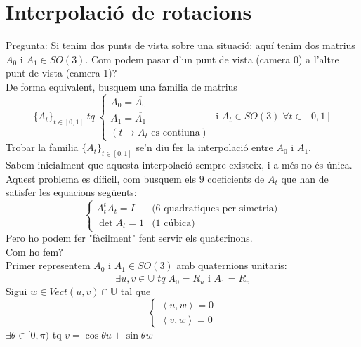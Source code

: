 \documentclass[a4paper,12pt]{article}
\begin{document}
	\section{Interpolació de rotacions}
	Pregunta: Si tenim dos punts de vista sobre una situació: aquí tenim dos matrius $A_0$ i $A_1 \in SO(3)$. Com podem pasar d'un punt de vista (camera 0) a l'altre punt de vista (camera 1)?\\
	De forma equivalent, busquem una familia de matrius
	\begin{displaymath}
		\{A_t\}_{t\in[0,1]}\;tq\;\begin{cases}
			A_0 = \overline{A_0}\\
			A_1 = \overline{A_1}\\
			(t \mapsto A_t \text{ es contiuna})
		\end{cases}
		\text{ i } A_t \in SO(3)\;\forall t \in [0,1]
	\end{displaymath}
	Trobar la familia $\{A_t\}_{t\in[0,1]}$ se'n diu fer la interpolació entre $\overline{A_0}$ i $\overline{A_1}$.\\
	Sabem inicialment que aquesta interpolació sempre existeix, i a més no és única.\\
	Aquest problema es díficil, com busquem els $9$ coeficients de $A_t$ que han de satisfer les equacions següents:
	\begin{displaymath}
		\begin{cases}
			A_t^tA_t = I &\text{(6 quadratiques per simetria)}\\
			\det{A_t} = 1 &\text{(1 cúbica)}
		\end{cases}
	\end{displaymath}
	Pero ho podem fer "fàcilment" fent servir els quaterinons.\\
	Com ho fem?\\
	Primer representem $\overline{A_0}$ i $\overline{A_1} \in SO(3)$ amb quaternions unitaris:
	\begin{displaymath}
		\exists u, v \in \mathbb{U}\;tq\;\overline{A_0} = R_u \text{ i } \overline{A_1} = R_v
	\end{displaymath}
	Sigui $w \in Vect(u, v) \cap \mathbb{U}$ tal que
	\begin{displaymath}
		\begin{cases}
			\left\langle u, w \right\rangle = 0\\
			\left\langle v, w \right\rangle = 0
		\end{cases}
	\end{displaymath}
	$\exists \theta \in [0, \pi)$ tq $v = \cos{\theta}u + \sin{\theta}w$\\
\end{document}
